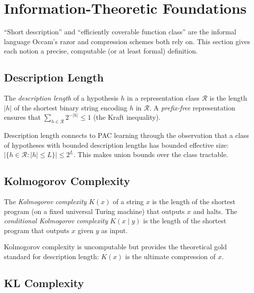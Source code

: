 \section{Information-Theoretic Foundations}
\label{sec:info-foundations}

``Short description'' and ``efficiently coverable function class'' are the
informal language Occam's razor and compression schemes both rely on.  This
section gives each notion a precise, computable (or at least formal) definition.

\subsection{Description Length}

\begin{defn}
\label{def:description-length}
The \emph{description length} of a hypothesis $h$ in a representation class
$\mathcal{R}$ is the length $|h|$ of the shortest binary string encoding $h$ in
$\mathcal{R}$.  A \emph{prefix-free} representation ensures that
$\sum_{h \in \mathcal{R}} 2^{-|h|} \leq 1$ (the Kraft inequality).
\end{defn}

Description length connects to PAC learning through the observation that a
class of hypotheses with bounded description lengths has bounded effective size:
$|\{h \in \mathcal{R} : |h| \leq L\}| \leq 2^L$.  This makes union bounds
over the class tractable.

\subsection{Kolmogorov Complexity}

\begin{defn}
\label{def:kolmogorov}
The \emph{Kolmogorov complexity} $K(x)$ of a string $x$ is the length of the
shortest program (on a fixed universal Turing machine) that outputs $x$ and
halts.  The \emph{conditional Kolmogorov complexity} $K(x \mid y)$ is the length
of the shortest program that outputs $x$ given $y$ as input.
\end{defn}

Kolmogorov complexity is uncomputable but provides the theoretical gold standard
for description length: $K(x)$ is the ultimate compression of $x$.

\subsection{KL Complexity}

